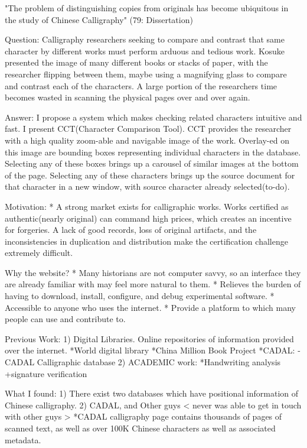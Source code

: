 

"The problem of distinguishing copies from originals has become ubiquitous in the study of Chinese Calligraphy" (79: Dissertation)

    Question:  Calligraphy researchers seeking to compare and contrast that same character by different works must perform arduous and tedious work.
                Kosuke presented the image of many different books or stacks of paper, with the researcher flipping between them,  maybe using a magnifying glass to compare and contrast each of the characters.  A large portion of the researchers time becomes wasted in scanning the physical pages over and over again.


    Answer:  I propose a system which makes checking related characters intuitive and fast.  I present CCT(Character Comparison Tool).  CCT provides the researcher with a high quality zoom-able and navigable image of the work.  Overlay-ed on this image are bounding boxes representing individual characters in the database.  Selecting any of these boxes brings up a carousel of similar images at the bottom of the page.  Selecting any of these characters brings up the source document for that character in a new window, with source character already selected(to-do).  

Motivation:
    *  A strong market exists for calligraphic works.  Works certified as authentic(nearly original) can command high prices, which creates an incentive for forgeries.  A lack of good records, loss of original artifacts, and the inconsistencies in duplication and distribution make the certification challenge extremely difficult.
    
Why the website?
    * Many historians are not computer savvy, so an interface they are already familiar with may feel more natural to them.
    * Relieves the burden of having to download, install, configure, and debug experimental software.
    * Accessible to anyone who uses the internet.
    * Provide  a platform to which many people can use and contribute to.

    
Previous Work:
    1) Digital Libraries.  Online repositories of information provided over the internet.
        *World digital library
        *China Million Book Project
            *CADAL:
                -CADAL Calligraphic database
    2) ACADEMIC work:
        *Handwriting analysis
            +signature verification
            

What I found:
    1)  There exist two databases which have positional information of Chinese calligraphy.
    2)  CADAL, and Other guys < never was able to get in touch with other guys >
        *CADAL calligraphy page contains thousands of pages of scanned text, as well as over 100K Chinese characters as well as associated metadata.

